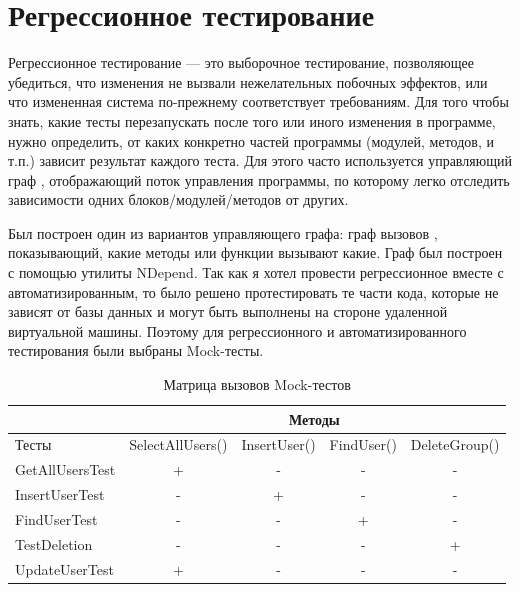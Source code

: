 \chapter{Регрессионное тестирование}

Регрессионное тестирование — это выборочное тестирование, позволяющее
убедиться, что изменения не вызвали нежелательных побочных эффектов, или что
измененная система по-прежнему соответствует требованиям.
Для того чтобы знать, какие тесты перезапускать после того или иного изменения в
программе, нужно определить, от каких конкретно частей программы (модулей, методов,
и т.п.) зависит результат каждого теста. Для этого часто используется управляющий
граф , отображающий поток управления программы, по которому легко отследить
зависимости одних блоков/модулей/методов от других.

Был построен один из вариантов управляющего графа: граф вызовов ,
показывающий, какие методы или функции вызывают какие. Граф был построен с
помощью утилиты NDepend. Так как я хотел провести регрессионное вместе с автоматизированным, то было решено протестировать те части кода, которые не зависят от базы данных и могут быть выполнены на стороне удаленной виртуальной машины. Поэтому для регрессионного и автоматизированного тестирования были выбраны Mock-тесты. 
 
\begin{table}
\caption{\label{tab:block_graph-test} Матрица вызовов Mock-тестов}
\begin{center}
\begin{tabular}{|l|c|c|c|c|}

\hline
 & \multicolumn{4}{|c|}{Методы} \\
\hline
Тесты & SelectAllUsers() & InsertUser() & FindUser() & DeleteGroup()\\
\hline
GetAllUsersTest & + & - & - & -\\
\hline
InsertUserTest & - & + & - & -\\
\hline
FindUserTest & - & - & + & -\\
\hline
TestDeletion & - & - & - & +\\
\hline
UpdateUserTest& + & - & - & -\\
\hline

\end{tabular}
\end{center}
\end{table} 

